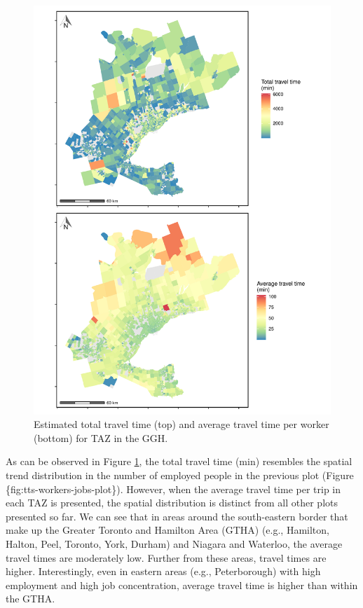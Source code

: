 \documentclass[Royal,times,sageh]{sagej}
\begin{document}
\begin{figure}
\includegraphics[width=1\linewidth]{Manuscript-Data-Package_files/figure-latex/plot-tt-ttpertrip-1} \caption{\label{fig:plot-tt-ttpertrip}Estimated total travel time (top) and average travel time per worker (bottom) for TAZ in the GGH.}\label{fig:plot-tt-ttpertrip}
\end{figure}

\newpage

As can be observed in Figure \ref{fig:plot-tt-ttpertrip}, the total
travel time (min) resembles the spatial trend distribution in the number
of employed people in the previous plot (Figure
\{fig:tts-workers-jobs-plot\}). However, when the average travel time
per trip in each TAZ is presented, the spatial distribution is distinct
from all other plots presented so far. We can see that in areas around
the south-eastern border that make up the Greater Toronto and Hamilton
Area (GTHA) (e.g., Hamilton, Halton, Peel, Toronto, York, Durham) and
Niagara and Waterloo, the average travel times are moderately low.
Further from these areas, travel times are higher. Interestingly, even
in eastern areas (e.g., Peterborough) with high employment and high job
concentration, average travel time is higher than within the GTHA.
\end{document}
